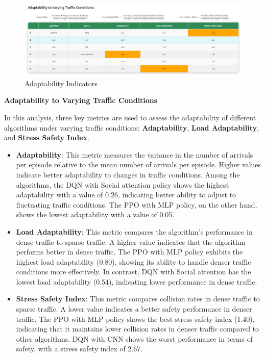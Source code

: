 \begin{figure}[H]
    \centering
    \includegraphics[height=0.25\textheight]{images/app_indicators_adapt.png} 
    \caption{Adaptability Indicators}
\end{figure}

\textbf{Adaptability to Varying Traffic Conditions}

In this analysis, three key metrics are used to assess the adaptability of different algorithms under varying traffic conditions: \textbf{Adaptability}, \textbf{Load Adaptability}, and \textbf{Stress Safety Index}.

\begin{itemize}
    \item \textbf{Adaptability}: This metric measures the variance in the number of arrivals per episode relative to the mean number of arrivals per episode. Higher values indicate better adaptability to changes in traffic conditions. Among the algorithms, the DQN with Social attention policy shows the highest adaptability with a value of 0.26, indicating better ability to adjust to fluctuating traffic conditions. The PPO with MLP policy, on the other hand, shows the lowest adaptability with a value of 0.05.
    
    \item \textbf{Load Adaptability}: This metric compares the algorithm’s performance in dense traffic to sparse traffic. 
    A higher value indicates that the algorithm performs better in dense traffic. The PPO with MLP policy exhibits the highest load adaptability (0.80), showing its ability to handle denser traffic conditions more effectively.
    In contrast, DQN with  Social attention has the lowest load adaptability (0.54), indicating lower performance in dense traffic.

    \item \textbf{Stress Safety Index}: This metric compares collision rates in dense traffic to sparse traffic. 
    A lower value indicates a better safety performance in denser traffic. The PPO with MLP policy shows the best stress safety index (1.40), indicating that it maintains lower collision rates in denser traffic compared to other algorithms. 
    DQN with CNN shows the worst performance in terms of safety, with a stress safety index of 2.67.
\end{itemize}

